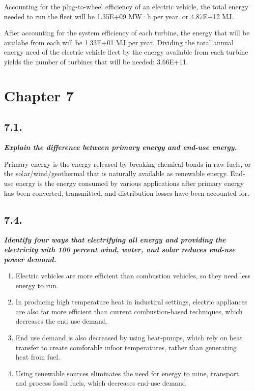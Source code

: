 \documentclass[
  letterpaper,
  DIV=11,
  numbers=noendperiod]{scrartcl}
\providecommand{\tightlist}{%
  \setlength{\itemsep}{0pt}\setlength{\parskip}{0pt}}\usepackage{longtable,booktabs,array}
\begin{document}
Accounting for the plug-to-wheel efficiency of an electric vehicle, the
total energy needed to run the fleet will be 1.35E+09 MW·h per year, or
4.87E+12 MJ.

After accounting for the system efficiency of each turbine, the energy
that will be availabe from each will be 1.33E+01 MJ per year. Dividing
the total annual energy need of the electric vehicle fleet by the energy
available from each turbine yields the number of turbines that will be
needed: 3.66E+11.

\hypertarget{chapter-7}{%
\section{Chapter 7}\label{chapter-7}}

\hypertarget{section-7}{%
\subsection{7.1.}\label{section-7}}

\textbf{\emph{Explain the difference between primary energy and end-use
energy.}}

Primary energy is the energy released by breaking chemical bonds in raw
fuels, or the solar/wind/geothermal that is naturally available as
renewable energy. End-use energy is the energy consumed by various
applications after primary energy has been converted, transmitted, and
distribution losses have been accounted for.

\hypertarget{section-8}{%
\subsection{7.4.}\label{section-8}}

\textbf{\emph{Identify four ways that electrifying all energy and
providing the electricity with 100 percent wind, water, and solar
reduces end-use power demand. }}

\begin{enumerate}
\def\labelenumi{\arabic{enumi}.}
\tightlist
\item
  Electric vehicles are more efficient than combustion vehicles, so they
  need less energy to run.
\item
  In producing high temperature heat in industiral settings, electric
  appliances are also far more efficient than current combustion-based
  techniques, which decreases the end use demand.
\item
  End use demand is also decreased by using heat-pumps, which rely on
  heat transfer to create comforable infoor temperatures, rather than
  generating heat from fuel.
\item
  Using renewable sources eliminates the need for energy to mine,
  transport and process fossil fuels, which decreases end-use demand
\end{enumerate}
\end{document}

